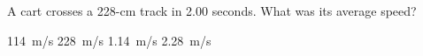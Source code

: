 \documentclass[addpoints]{exam}
\begin{document}
\begin{questions}
\question
A cart crosses a 228-cm track in 2.00 seconds. What was its average speed?

\begin{choices}
    \choice \SI{114}{m/s}
    \choice \SI{228}{m/s}
    \correctchoice \SI{1.14}{m/s}
    \choice \SI{2.28}{m/s}
\end{choices}











\end{questions}
\end{document}
